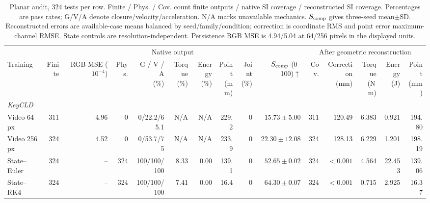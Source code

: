 \documentclass[10pt,twocolumn,letterpaper]{article}
\begin{document}
\begin{table}[t]
\caption{Planar audit, 324 tests per row. Finite / Phys. / Cov. count finite outputs / native SI coverage / reconstructed SI coverage. Percentages are pass rates; G/V/A denote closure/velocity/acceleration. N/A marks unavailable mechanics. $S_{\rm comp}$ gives three-seed mean$\pm$SD. Reconstructed errors are available-case means balanced by seed/family/condition; correction is coordinate RMS and point error maximum-channel RMSE. State controls are resolution-independent. Persistence RGB MSE is 4.94/5.04 at 64/256 pixels in the displayed units.}
\label{tab:corpus}
\label{tab:geometry-readout}
\centering\small
\setlength{\tabcolsep}{1.7pt}
\begin{tabular}{@{}lrrrrrrrrr@{\hspace{5pt}}rrrrr@{}}
\toprule
& \multicolumn{9}{c}{Native output} & \multicolumn{5}{c}{After geometric reconstruction}\\
\cmidrule(lr){2-10}\cmidrule(l){11-15}
Training & Finite & \shortstack{RGB MSE\\($10^{-4}$)} & Phys. & \shortstack{G / V / A\\(\%)} & \shortstack{Torque\\(\%)} & \shortstack{Energy\\(\%)} & \shortstack{Point\\(mm)} & \shortstack{Joint\\(\%)} & \shortstack{$S_{\rm comp}$\\(0--100)$\uparrow$} & Cov. & \shortstack{Correction\\(mm)} & \shortstack{Torque\\(N\,m)} & \shortstack{Energy\\(J)} & \shortstack{Point\\(mm)}\\
\midrule
\multicolumn{15}{l}{\textit{KeyCLD}}\\
Video 64 px & 311 & 4.96 & 0 & 0/22.2/65.1 & N/A & N/A & 229.2 & 0 & $15.73\pm5.00$ & 311 & 120.49 & 6.383 & 0.921 & 194.80 \\
Video 256 px & 324 & 4.52 & 0 & 0/53.7/75 & N/A & N/A & 233.9 & 0 & $22.30\pm12.08$ & 324 & 128.13 & 6.229 & 1.201 & 198.19 \\
State--Euler & 324 & -- & 324 & 100/100/100 & 8.33 & 0.00 & 139.1 & 0 & $52.65\pm0.02$ & 324 & $<0.001$ & 4.564 & 22.453 & 139.06 \\
State--RK4 & 324 & -- & 324 & 100/100/100 & 7.41 & 0.00 & 16.4 & 0 & $64.30\pm0.07$ & 324 & $<0.001$ & 0.715 & 2.925 & 16.37 \\

\end{tabular}
\end{table}
\end{document}
